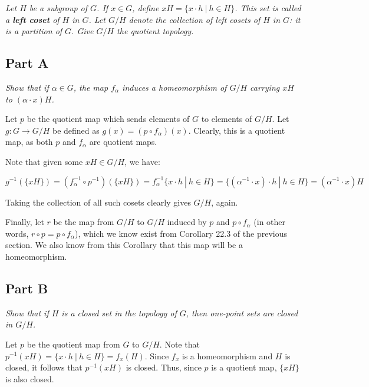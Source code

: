 \documentclass[10pt, oneside]{amsart}
\begin{document}
    \textit{Let $H$ be a subgroup of $G$. If $x \in G$, define $xH = \{x \cdot h \ | \ h \in H\}$. This set is called a \textbf{left coset} of $H$ in $G$. Let $G/H$ denote the collection of left cosets
      of $H$ in $G$: it is a partition of $G$. Give $G/H$ the quotient topology.}

    \hrulefill

    \subsection{Part A}

    \textit{Show that if $\alpha \in G$, the map $f_{\alpha}$ induces a homeomorphism of $G/H$ carrying $xH$ to $(\alpha \cdot x)H$.}
    \newline

    Let $p$ be the quotient map which sends elements of $G$ to elements of $G/H$. Let $g : G \rightarrow G/H$ be defined as $g(x) = (p \circ f_{\alpha})(x)$. Clearly, this is a quotient map,
    as both $p$ and $f_{\alpha}$ are quotient maps.
    \newline

    Note that given some $xH \in G/H$, we have:

    $$g^{-1}(\{xH\}) = (f_{\alpha}^{-1} \circ p^{-1})(\{xH\}) = f^{-1}_{\alpha} \{x \cdot h \ | \ h \in H\} = \{(\alpha^{-1} \cdot x) \cdot h \ | \ h \in H\} = (\alpha^{-1} \cdot x)H$$
    \vspace{5pt}

    Taking the collection of all such cosets clearly gives $G/H$, again.
    \newline

    Finally, let $r$ be the map from $G/H$ to $G/H$ induced by $p$ and $p \circ f_{\alpha}$ (in other words, $r \circ p = p \circ f_{\alpha}$), which we know exist from Corollary 22.3 of the previous section. We also
    know from this Corollary that this map will be a homeomorphism.

    \hrulefill

    \subsection{Part B}

    \textit{Show that if $H$ is a closed set in the topology of $G$, then one-point sets are closed in $G/H$.}
    \newline

    Let $p$ be the quotient map from $G$ to $G/H$. Note that $p^{-1}(xH) = \{x \cdot h \ | \ h \in H\} = f_x(H)$. Since $f_x$ is a homeomorphism and $H$ is closed,
    it follows that $p^{-1}(xH)$ is closed. Thus, since $p$ is a quotient map, $\{xH\}$ is also closed.
\end{document}
